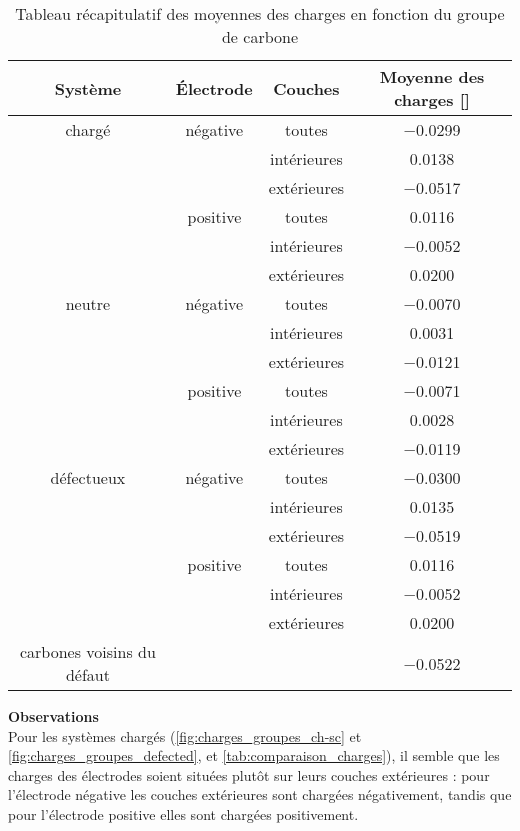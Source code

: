 \begin{table}[h!]
    \centering
    \begin{tabular}{c | c | c || c}
        \hline
        Système &Électrode &Couches &Moyenne des charges [\unit{\e}]\\
        \hline
        chargé &négative &toutes &\num{-0.0299}\\
         & &intérieures &\num{0.0138}\\
         & &extérieures &\num{-0.0517}\\
         &positive &toutes &\num{0.0116}\\
         & &intérieures &\num{-0.0052}\\
         & &extérieures &\num{0.0200}\\
        \hline
        neutre &négative &toutes &\num{-0.0070}\\
         & &intérieures &\num{0.0031}\\
         & &extérieures &\num{-0.0121}\\
        &positive &toutes &\num{-0.0071}\\
         & &intérieures &\num{0.0028}\\
         & &extérieures &\num{-0.0119}\\ 
        \hline
        défectueux &négative &toutes &\num{-0.0300}\\
         & &intérieures &\num{0.0135}\\
         & &extérieures &\num{-0.0519}\\
         &positive &toutes &\num{0.0116}\\
         & &intérieures &\num{-0.0052}\\
         & &extérieures &\num{0.0200}\\
        carbones voisins du défaut & & &\num{-0.0522}\\
        \hline
    \end{tabular}
    \caption{Tableau récapitulatif des moyennes des charges en fonction du groupe de carbone}
    \label{tab:comparaison_charges}
\end{table}

\clearpage

\textbf{Observations}\\
Pour les systèmes chargés (\autoref{fig:charges_groupes_ch-sc} et \ref{fig:charges_groupes_defected}, et \autoref{tab:comparaison_charges}), il semble que les charges des électrodes soient situées plutôt sur leurs couches extérieures : pour l'électrode négative les couches extérieures sont chargées négativement, tandis que pour l'électrode positive elles sont chargées positivement.


